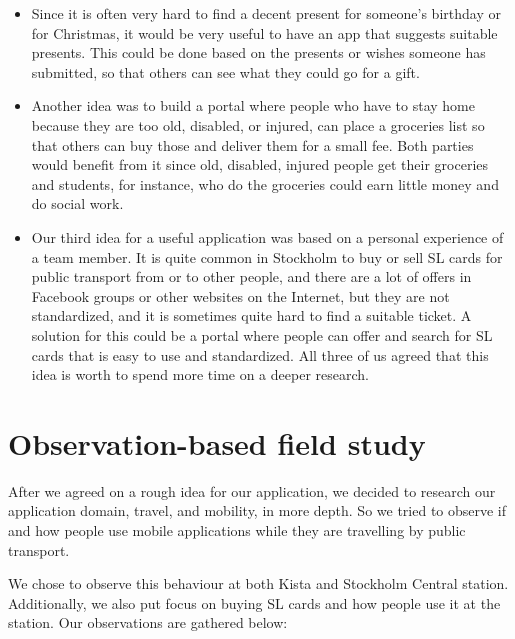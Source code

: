 \documentclass[11pt,twoside,a4paper]{report}
\begin{document}
\begin{itemize}
\item Since it is often very hard to find a decent present for someone's birthday or for Christmas, it would be very useful to have an app that suggests suitable presents. This could be done based on the presents or wishes someone has submitted, so that others can see what they could go for a gift.
\item Another idea was to build a portal where people who have to stay home because they are too old, disabled, or injured, can place a groceries list so that others can buy those and deliver them for a small fee. Both parties would benefit from it since old, disabled, injured people get their groceries and students, for instance, who do the groceries could earn little money and do social work.
\item Our third idea for a useful application was based on a personal experience of a team member. It is quite common in Stockholm to buy or sell SL cards for public transport from or to other people, and there are a lot of offers in Facebook groups or other websites on the Internet, but they are not standardized, and it is sometimes quite hard to find a suitable ticket. A solution for this could be a portal where people can offer and search for SL cards that is easy to use and standardized. All three of us agreed that this idea is worth to spend more time on a deeper research.
\end{itemize}

\section{Observation-based field study}

After we agreed on a rough idea for our application, we decided to research our application domain, travel, and mobility, in more depth. So we tried to observe if and how people use mobile applications while they are travelling by public transport.

We chose to observe this behaviour at both Kista and Stockholm Central station. Additionally, we also put focus on buying SL cards and how people use it at the station. Our observations are gathered below:
\end{document}
